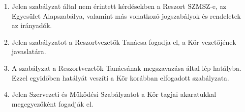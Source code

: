 \documentclass[12pt]{article}
\begin{document}
\begin{enumerate}
\item Jelen szabályzat által nem érintett kérdésekben a Reszort SZMSZ-e, az Egyesület Alapszabálya, valamint más vonatkozó jogszabályok és rendeletek az irányadók.
\item Jelen szabályzatot a Reszortvezetők Tanácsa fogadja el, a Kör vezetőjének javaslatára.
\item A szabályzat a Reszortvezetők Tanácsának megszavazása által lép hatályba. Ezzel egyidőben hatályát veszíti a Kör korábban elfogadott szabályzata.
\item Jelen Szervezeti és Működési Szabályzatot a Kör tagjai akaratukkal megegyezőként fogadják el.
\end{enumerate}

\end{document}
